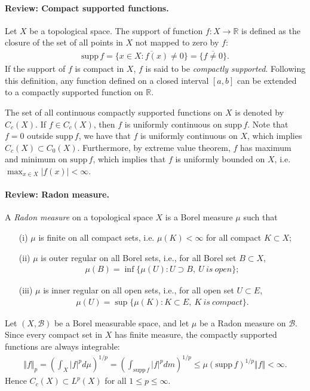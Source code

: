 \documentclass{article}
\newcommand{\supp}{\mathrm{supp}\,}
\begin{document}
\paragraph{Review: Compact supported functions.} Let $X$ be a topological space. The support of function $f:X\to\mathbb{R}$ is defined as the closure of the set of all points in $X$ not mapped to zero by $f$:
\begin{align*}
	\supp f = \overline{\{x\in X: f(x)\neq 0\}} = \overline{\{f\neq 0\}}.
\end{align*}
If the support of $f$ is compact in $X$, $f$ is said to be \textit{compactly supported}. Following this definition, any function defined on a closed interval $[a,b]$ can be extended to a compactly supported function on $\mathbb{R}$.

The set of all continuous compactly supported functions on $X$ is denoted by $C_c(X)$. If $f\in C_c(X)$, then $f$ is uniformly continuous on $\supp f$. Note that $f=0$ outside $\supp f$, we have that $f$ is uniformly continuous on $X$, which implies $C_c(X)\subset C_0(X)$. Furthermore, by extreme value theorem, $f$ has maximum and minimum on $\supp f$, which implies that $f$ is uniformly bounded on $X$, i.e. $\max_{x\in X}\vert f(x)\vert < \infty$.

\newpage
\paragraph{Review: Radon measure.} A \textit{Radon measure} on a topological space $X$ is a Borel measure $\mu$ such that
\begin{itemize}
\item[(i)] $\mu$ is finite on all compact sets, i.e.  $\mu(K)<\infty$ for all compact $K\subset X$;
\item[(ii)] $\mu$ is outer regular on all Borel sets, i.e., for all Borel set $B\subset X$,
\begin{align*}
	\mu(B)=\inf\{\mu(U):U\supset B,\ U\ is\ open\};
\end{align*}
\item[(iii)] $\mu$ is inner regular on all open sets, i.e., for all open set $U\subset E$,
\begin{align*}
	\mu(U)=\sup\{\mu(K):K\subset E,\ K\ is\ compact\}.
\end{align*}
\end{itemize}

Let $(X,\mathscr{B})$ be a Borel measurable space, and let $\mu$ be a Radon measure on $\mathscr{B}$. Since every compact set in $X$ has finite measure, the compactly supported functions are always integrable:
\begin{align*}
	\Vert f\Vert_p = \left(\int_X\vert f\vert^p d\mu\right)^{1/p} = \left(\int_{\supp f} \vert f\vert^p dm\right)^{1/p} \leq \mu(\supp f)^{1/p}\Vert f\Vert <\infty.
\end{align*}
Hence $C_c(X)\subset L^p(X)$ for all $1\leq p\leq \infty$.
\end{document}
